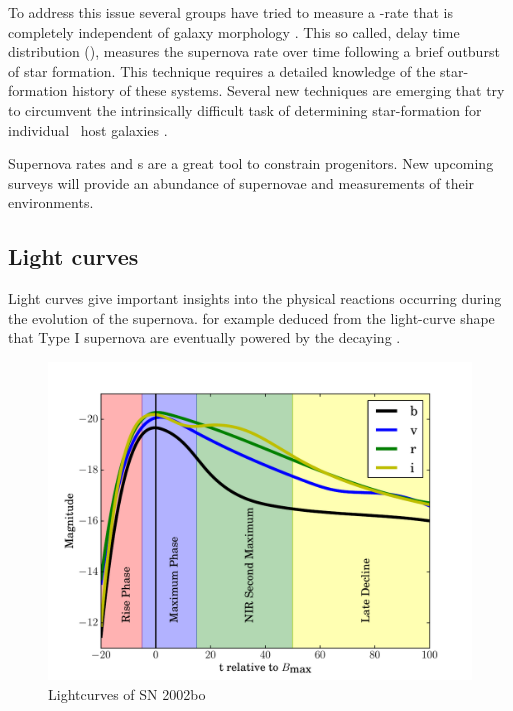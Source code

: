 To address this issue several groups have tried to measure a \sneia-rate that is completely independent of galaxy morphology \citep[e.g.][]{2006MNRAS.370..773M, 2010ApJ...722.1879M}. This so called, delay time distribution (\dtd), measures the supernova rate over time following a brief outburst of star formation.
This technique requires a detailed knowledge of the star-formation history of these systems. Several new techniques are emerging that try to circumvent the intrinsically difficult task of determining star-formation for individual \sneia\ host galaxies \citep{2010MNRAS.407.1314M, 2010arXiv1010.5786B, 2008PASJ...60.1327T, 2010ApJ...722.1879M}.

Supernova rates and \dtd s are a great tool to constrain progenitors. New upcoming surveys will provide an abundance of supernovae and measurements of their environments.

\subsection{Light curves} 
\label{sec:intro_lc}
Light curves give important insights into the physical reactions occurring during the evolution of the supernova. \cite{1982ApJ...253..785A} for example deduced from the light-curve shape that Type I supernova are eventually powered by the decaying \Co. 


\begin{figure}[htb] %
   \centering
   \includegraphics[width=\textwidth]{chapter_intro/plots/lightcurve_2002bo.pdf} 
   \caption{Lightcurves of SN 2002bo \citep[data from ][]{2004MNRAS.348..261B}}
   \label{fig:lightcurve_2002bo}
\end{figure}

